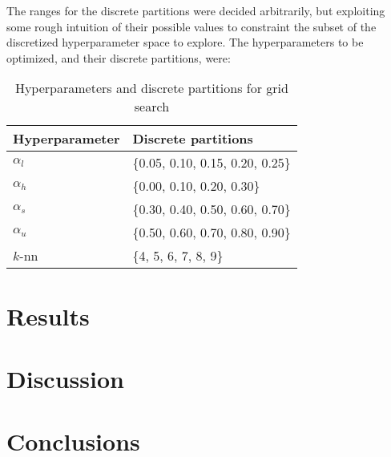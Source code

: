 \documentclass[oneside, a4paper, draft]{memoir} %
\begin{document}
The ranges for the discrete partitions were decided  arbitrarily, but
exploiting some rough intuition of their possible values to constraint the subset of the discretized hyperparameter
space to explore. The hyperparameters to be optimized, and their discrete partitions, were:
\begin{table}[here]
	\label{tbl:hyper}
	\centering
	\begin{tabular}{ll}
		\hline
		Hyperparameter & Discrete partitions\\
		\hline
		$\alpha_l$ & \{0.05, 0.10, 0.15, 0.20, 0.25\}\\
		$\alpha_h$ & \{0.00, 0.10, 0.20, 0.30\}\\
		$\alpha_s$ & \{0.30, 0.40, 0.50, 0.60, 0.70\}\\
		$\alpha_u$ & \{0.50, 0.60, 0.70, 0.80, 0.90\}\\
		$k$-nn & \{4, 5, 6, 7, 8, 9\}\\
		\hline
	\end{tabular}
	\caption{Hyperparameters and discrete partitions for grid search}
\end{table}

\section{Results}
\textcolor{gray}{\lipsum[83]}

\section{Discussion}
\textcolor{gray}{\lipsum[87]}

\section{Conclusions}
\textcolor{gray}{\lipsum[89]}

\nocite{duda2001pattern}



\appendix
\end{document}
